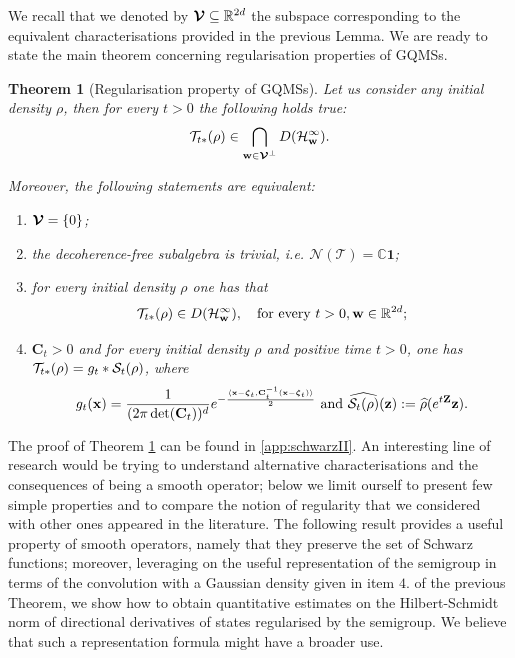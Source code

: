 \documentclass[preprint]{elsarticle}
\newtheorem{theo}[defi]{Theorem}
\theoremstyle{definition}
\def\CC{\mathbb{C}}
\def\RR{\mathbb{R}}
\def\TT{\mathcal{T}}
\def\NN{\mathcal{N}(\TT)}
\begin{document}
 We recall that we denoted by $\boldsymbol{{\cal V}}\subseteq \RR^{2d}$ the subspace corresponding to the equivalent characterisations provided in the previous Lemma. We are ready to state the main theorem concerning regularisation properties of GQMSs.

\begin{theo}[Regularisation property of GQMSs] \label{theo:regularisation}
Let us consider any initial density $\rho$, then for every $t>0$ the following holds true:
\begin{equation} \label{eq:regularisation}
\TT_{t*}(\rho) \in \bigcap_{\mathbf{w} \in \boldsymbol{{\cal V}}^\perp}D({\cal H}_\mathbf{w}^\infty).
\end{equation}

Moreover, the following statements are equivalent:
\begin{enumerate}
    \item $\boldsymbol{{\cal V}}=\{0\}$;
     \item the decoherence-free subalgebra is trivial, i.e. $\NN=\CC \mathbf{1}$;
     \item for every initial density $\rho$ one has that
     $$\TT_{t*}(\rho) \in D({\cal H}^\infty_{\mathbf{w}}), \quad  \text{for every }t>0, \mathbf{w} \in \RR^{2d};$$
     \item $\mathbf{C}_t>0$ and for every initial density $\rho$ and positive time $t>0$, one has $\TT_{t*}(\rho)=g_t*{\cal S}_t(\rho)$, where
        $$g_t(\mathbf{x})=\frac{1}{(2\pi \det(\mathbf{C}_t))^d}e^{-\frac{\langle \mathbf{x}-\boldsymbol{\zeta}_t,\mathbf{C}_t^{-1}(\mathbf{x}-\boldsymbol{\zeta}_t)\rangle}{2}} \text{ and }\widehat{{\cal S}_t(\rho)}(\mathbf{z}):=\widehat{\rho}(e^{t\mathbf{Z}}\mathbf{z}).$$
\end{enumerate}
\end{theo}

The proof of Theorem \ref{theo:regularisation} can be found in \ref{app:schwarzII}. An interesting line of research would be trying to understand alternative characterisations and the consequences of being a smooth operator; below we limit ourself to present few simple properties and to compare the notion of regularity that we considered with other ones appeared in the literature. The following result provides a useful property of smooth operators, namely that they preserve the set of Schwarz functions; moreover, leveraging on the useful representation of the semigroup in terms of the convolution with a Gaussian density given in item $4.$ of the previous Theorem, we show how to obtain quantitative estimates on the Hilbert-Schmidt norm of directional derivatives of states regularised by the semigroup. We believe that such a representation formula might have a broader use.
\end{document}
